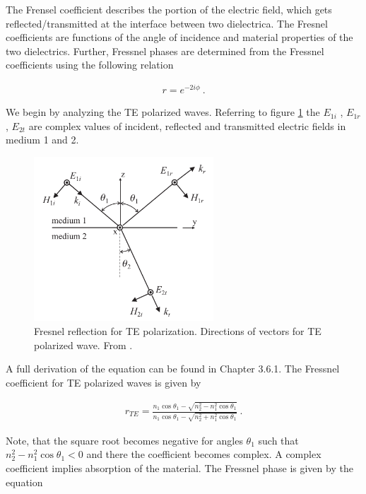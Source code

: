 The Frensel coefficient describes the portion of the electric field, which gets reflected/transmitted at the interface between two dielectrica. The Fresnel coefficients are functions of the angle of incidence and material properties of the two dielectrics. Further, Fressnel phases are determined from the Fressnel coefficients using the following relation

\begin{align}
r = e^{-2i\phi}~.
\end{align}

We begin by analyzing the TE polarized waves. Referring to figure \ref{fig:FressnelCoefficients} the $E_{1i}$ , $E_{1r}$ , $E_{2t}$ are complex values of incident, reflected and transmitted electric fields in medium 1 and 2.


\begin{figure}[h!]
    \centering
    \includegraphics[width=0.6\textwidth]{figures/FressnelCoefficients.png}
    \caption{Fresnel reflection for TE polarization. Directions of vectors for TE polarized wave. From \cite{wartak2013computational}.}
    \label{fig:FressnelCoefficients}
\end{figure}

A full derivation of the equation can be found in \cite{wartak2013computational} Chapter 3.6.1. The Fressnel coefficient for TE polarized waves is given by

\begin{align}
r_{TE} = \frac{n_1 \cos \theta_1 - \sqrt{n_2^2 - n_1^2 \cos \theta_1}}{n_1 \cos \theta_1 - \sqrt{n_2^2 + n_1^2 \cos \theta_1}}~.
\end{align}

Note, that the square root becomes negative for angles $\theta_1$ such that $n_2^2 - n_1^2 \cos \theta_1 < 0$ and there the coefficient becomes complex. A complex coefficient implies absorption of the material. The Fressnel phase is given by the equation

